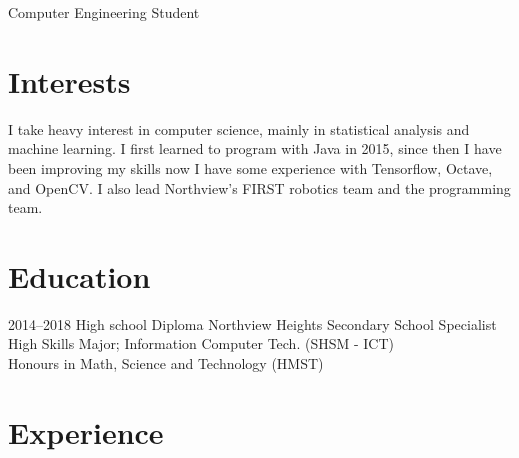\documentclass[]{chandan-cv}
\begin{document}
       {Computer Engineering Student}



\section{Interests}

I take heavy interest in computer science, mainly in statistical analysis and machine learning. I first learned to program with Java in 2015, since then I have been improving my skills now I have some experience with Tensorflow, Octave, and OpenCV. I also lead Northview's FIRST robotics team and the programming team.

\section{Education}

\begin{entrylist}
  \entry
    {2014–2018}
    {High school Diploma{\normalfont}}
    {Northview Heights Secondary School}
    {Specialist High Skills Major; Information Computer Tech. (SHSM - ICT)\\
    Honours in Math, Science and Technology (HMST)}
\end{entrylist}

\section{Experience}
\end{document}
